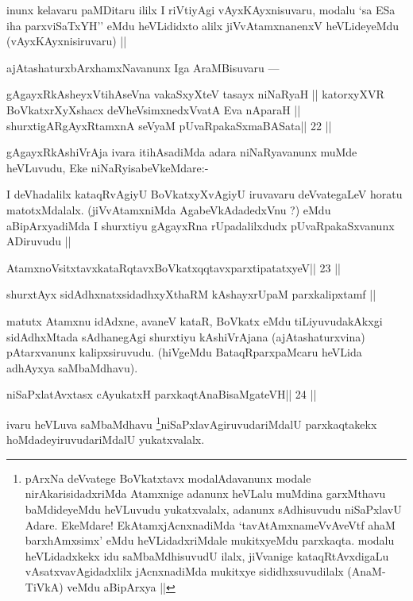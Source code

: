 \begin{artha}
inunx kelavaru paMDitaru ililx I riVtiyAgi vAyxKAyxnisuvaru, modalu 
`sa ESa iha parxviSaTxYH'' eMdu heVLididxto alilx jiVvAtamxnanenxV heVLideyeMdu (vAyxKAyxnisiruvaru) ||
\end{artha}

\begin{artha}
ajAtashaturxbArxhamxNavanunx Iga AraMBisuvaru --- 
\end{artha}

\begin{shl}
gAgayxRkAsheyxVtihAseVna vakaSxyXteV tasayx niNaRyaH ||
katorxyXVR BoVkatxrXyXshacx deVheV\s simxnedxVvatA Eva nAparaH ||
shurxtigARgAyxRtamxnA seVyaM pUvaRpakaSxmaBASata\hfill || 22 ||
\end{shl}

\begin{artha}
gAgayxRkAshiVrAja ivara itihAsadiMda adara niNaRyavanunx muMde heVLuvudu, Eke  niNaRyisabeVkeMdare:-
\end{artha} 
 
\begin{artha}
I deVhadalilx kataqRvAgiyU BoVkatxyXvAgiyU iruvavaru deVvategaLeV horatu matotxMdalalx. (jiVvAtamxniMda AgabeVkAdadedxVnu ?) eMdu aBipArxyadiMda I shurxtiyu gAgayxRna rUpadalilxdudx pUvaRpakaSxvanunx ADiruvudu ||
\end{artha}

\begin{shl}
AtamxnoV\s sitxtavxkataRqtavxBoVkatxqqtavxparxtipatatxyeV\hfill || 23 ||
\end{shl}

\begin{shl}
shurxtAyx sidAdhxnatxsidadhxyXthaRM kAshayxrUpaM parxkalipxtamf ||
\end{shl}

\begin{artha}
matutx Atamxnu idAdxne, avaneV kataR, BoVkatx eMdu tiLiyuvudakAkxgi sidAdhxMtada sAdhanegAgi shurxtiyu kAshiVrAjana (ajAtashaturxvina) pAtarxvanunx kalipxsiruvudu. (hiVgeMdu BataqRparxpaMcaru heVLida adhAyxya saMbaMdhavu).
\end{artha} 
 

\begin{shl}
niSaPxlatAvxtasx cAyukatxH parxkaqtAnaBisaMgateVH\hfill || 24 ||
\end{shl}

\begin{artha}
ivaru heVLuva saMbaMdhavu \footnote[1]{pArxNa deVvatege BoVkatxtavx 
modalAdavanunx modale nirAkarisidadxriMda Atamxnige adanunx heVLalu 
muMdina garxMthavu baMdideyeMdu heVLuvudu yukatxvalalx, adanunx sAdhisuvudu niSaPxlavU Adare. EkeMdare! EkAtamxjAcnxnadiMda `tavAtAmxnameVvAveVtf ahaM barxhAmxsimx' eMdu heVLidadxriMdale mukitxyeMdu parxkaqta. modalu heVLidadxkekx idu saMbaMdhisuvudU ilalx, jiVvanige kataqRtAvxdigaLu vAsatxvavAgidadxlilx jAcnxnadiMda mukitxye sididhxsuvudilalx (AnaM-TiVkA) veMdu aBipArxya ||
}niSaPxlavAgiruvudariMdalU parxkaqtakekx hoMdadeyiruvudariMdalU yukatxvalalx.
\end{artha}

